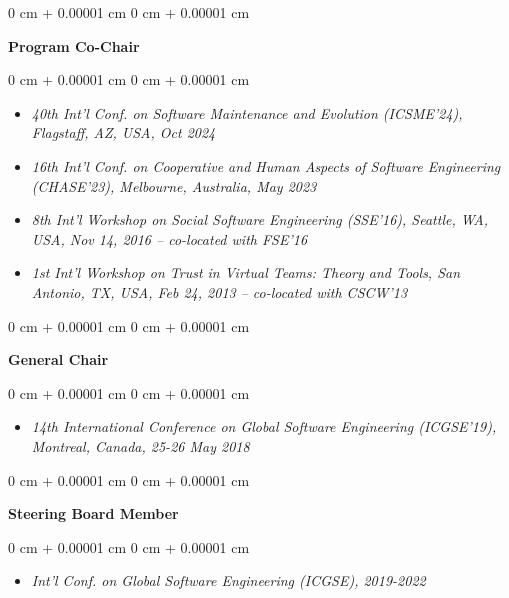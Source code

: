 \documentclass[10pt, a4paper]{article}
\newenvironment{highlights}{
    \begin{itemize}[
        topsep=0.10 cm,
        parsep=0.10 cm,
        partopsep=0pt,
        itemsep=0pt,
        leftmargin=0 cm + 10pt
    ]
}{
    \end{itemize}
} %
\newenvironment{onecolentry}{
    \begin{adjustwidth}{
        0 cm + 0.00001 cm
    }{
        0 cm + 0.00001 cm
    }
}{
    \end{adjustwidth}
} %
\begin{document}
        
        \begin{onecolentry}
            \textbf{Program Co-Chair}\end{onecolentry}

        \vspace{0.10 cm}
        \begin{onecolentry}
            \begin{highlights}
                \item \textit{40th Int’l Conf. on Software Maintenance and Evolution (ICSME’24), Flagstaff, AZ, USA, Oct 2024}
                \item \textit{16th Int’l Conf. on Cooperative and Human Aspects of Software Engineering (CHASE’23), Melbourne, Australia, May 2023}
                \item \textit{8th Int’l Workshop on Social Software Engineering (SSE’16), Seattle, WA, USA, Nov 14, 2016 – co-located with FSE'16}
                \item \textit{1st Int’l Workshop on Trust in Virtual Teams: Theory and Tools, San Antonio, TX, USA, Feb 24, 2013 – co-located with CSCW'13}
            \end{highlights}
        \end{onecolentry}


        \vspace{0.2 cm}

        \begin{onecolentry}
            \textbf{General Chair}\end{onecolentry}

        \vspace{0.10 cm}
        \begin{onecolentry}
            \begin{highlights}
                \item \textit{14th International Conference on Global Software Engineering (ICGSE'19), Montreal, Canada, 25-26 May 2018}
            \end{highlights}
        \end{onecolentry}


        \vspace{0.2 cm}

        \begin{onecolentry}
            \textbf{Steering Board Member}\end{onecolentry}

        \vspace{0.10 cm}
        \begin{onecolentry}
            \begin{highlights}
                \item \textit{Int'l Conf. on Global Software Engineering (ICGSE), 2019-2022}
            \end{highlights}
        \end{onecolentry}
\end{document}
